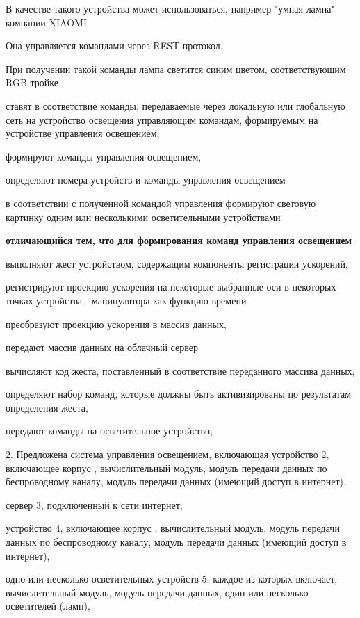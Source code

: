 В качестве такого устройства может использоваться, например "умная лампа" компании XIAOMI 

Она управляется командами через REST протокол.

При получении такой команды лампа светится синим цветом, соответствующим RGB тройке



ставят в соответствие команды, передаваемые через локальную или глобальную сеть на устройство освещения управляющим командам, формируемым на устройстве управления освещением, 

формируют команды управления освещением,

определяют номера устройств и команды управления освещением

в соответствии с полученной командой управления формируют световую картинку одним или несколькими осветительными устройствами 

\textbf{отличающийся тем, что для формирования команд управления освещением }

выполняют жест устройством, содержащим компоненты регистрации ускорений,

регистрируют проекцию ускорения на некоторые выбранные оси в некоторых точках устройства - манипулятора как функцию времени

преобразуют проекцию ускорения в массив данных, 

передают массив данных на облачный сервер

вычисляют код жеста, поставленный в соответствие переданного массива данных,

определяют набор команд, которые должны быть активизированы по результатам определения жеста,

передают команды на осветительное устройство, 



2. Предложена система управления освещением, включающая   
устройство 2, включающее корпус , вычислительный модуль, модуль передачи данных по беспроводному каналу, модуль передачи данных  (имеющий доступ в интернет),   

сервер 3, подключенный к сети интернет,

устройство 4, включающее корпус , вычислительный модуль, модуль передачи данных по беспроводному каналу, модуль передачи данных  (имеющий доступ в интернет),  

одно или несколько осветительных устройств 5,   каждое из которых включает, вычислительный модуль, модуль передачи данных, один или несколько осветителей (ламп),



